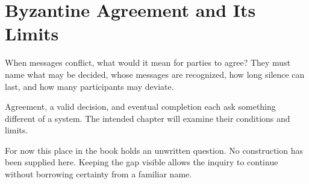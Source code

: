 \chapter{Byzantine Agreement and Its Limits}
\label{short:byzantine-generals}

When messages conflict, what would it mean for parties to agree? They must
name what may be decided, whose messages are recognized, how long silence
can last, and how many participants may deviate.

Agreement, a valid decision, and eventual completion each ask something
different of a system. The intended chapter will examine their conditions
and limits.

For now this place in the book holds an unwritten question. No construction
has been supplied here. Keeping the gap visible allows the inquiry to
continue without borrowing certainty from a familiar name.


